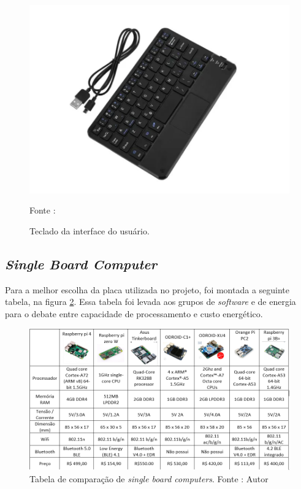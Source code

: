 \begin{figure}[H]
  \centering
  \includegraphics[scale=0.5]{figuras/TecladoPI2.png}
  \caption{Teclado da interface do usuário.}
  {\footnotesize Fonte : \cite{figura_Teclado}} 
  \label{fig:Teclado}
\end{figure}

\subsection{ \textit{Single Board Computer}}

\par Para a melhor escolha da placa utilizada no projeto, foi montada a seguinte tabela, na figura \ref{fig:comparacaoMicro}. Essa tabela foi levada aos grupos de \textit{software} e de energia para o debate entre capacidade de processamento e custo energético.

\begin{figure}[H]
  \centering
  \includegraphics[scale=0.8]{figuras/SBCcomparacao.png}
  \caption{Tabela de comparação de \textit{single board computers}. Fonte : Autor } 
  \label{fig:comparacaoMicro}
\end{figure}

